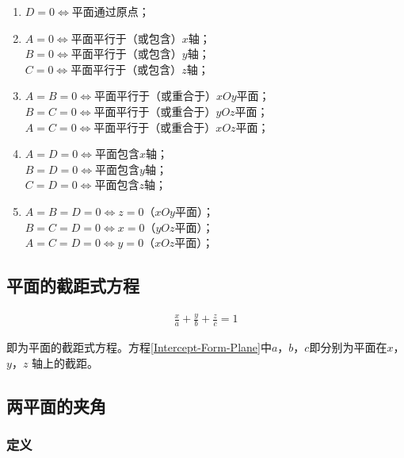 \documentclass[12pt, a4paper]{article}
\numberwithin{equation}{section}
\begin{document}
    \begin{enumerate}
        \item \(D=0 \Leftrightarrow \)平面通过原点；
        \item \(A=0 \Leftrightarrow \)平面平行于（或包含）\(x\)轴；
            \\
            \(B=0 \Leftrightarrow \)平面平行于（或包含）\(y\)轴；
            \\
            \(C=0 \Leftrightarrow \)平面平行于（或包含）\(z\)轴；
        \item \(A=B=0 \Leftrightarrow \)平面平行于（或重合于）\(xOy\)平面；
            \\
            \(B=C=0 \Leftrightarrow \)平面平行于（或重合于）\(yOz\)平面；
            \\
            \(A=C=0 \Leftrightarrow \)平面平行于（或重合于）\(xOz\)平面；
        \item \(A=D=0 \Leftrightarrow \)平面包含\(x\)轴；
            \\
            \(B=D=0 \Leftrightarrow \)平面包含\(y\)轴；
            \\
            \(C=D=0 \Leftrightarrow \)平面包含\(z\)轴；
        \item \(A=B=D=0 \Leftrightarrow z=0\)（\(xOy\)平面）；
            \\
            \(B=C=D=0 \Leftrightarrow x=0\)（\(yOz\)平面）；
            \\
            \(A=C=D=0 \Leftrightarrow y=0\)（\(xOz\)平面）；
    \end{enumerate}

\subsection{平面的截距式方程}

    \begin{align}
        \frac{x}{a} + \frac{y}{b} + \frac{z}{c} = 1
        \label{Intercept-Form-Plane}
    \end{align}

    即为平面的截距式方程。方程\ref{Intercept-Form-Plane}中\(a\)，\(b\)，\(c\)即分别为平面在\(x\)，\(y\)，\(z\)
    轴上的截距。

\subsection{两平面的夹角}

\subsubsection{定义}
\end{document}
